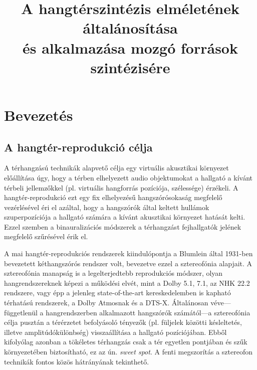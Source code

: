\documentclass[10pt,twoside]{article}
\author{\theauthor}
\title{A hangtérszintézis elméletének általánosítása\\[.5ex]és alkalmazása mozgó források szintézisére}
\theoremstyle{thesisgroupstyle}
\theoremstyle{indented}
\begin{document}
\sloppy
\newcommand{\schoolname}{Budapesti Műszaki és Gazdaságtudományi Egyetem}
\newcommand{\facultyname}{Villamosmérnöki és Informatikai Kar}
\newcommand{\doctoralname}{Villamosmérnöki Tudományok Doktori Iskola}
\newcommand{\bookname}{PhD tézisfüzet}
\newcommand{\authorname}{Author}
\newcommand{\supervisorname}{Konzulens:}
\newcommand{\supervisor}{Dr. Fiala Péter}
\newcommand{\creationdate}{Budapest, 2018.}
\def \deptlogo {logos/hit_logo_en.png}
\def \lablogo {logos/last_logo_eng.png}

\nonfrenchspacing


\thispagestyle{empty}
\cleardoublepage
\setcounter{page}{1}

\section{Bevezetés}

\subsection{A hangtér-reprodukció célja}
%
A térhangzású technikák alapvető célja egy virtuális akusztikai környezet előállítása úgy, hogy a térben elhelyezett audio objektumokat a hallgató a kívánt térbeli jellemzőkkel (pl. virtuális hangforrás pozíciója, szélessége) érzékeli.
A hangtér-reprodukció ezt egy fix elhelyezésű hangszórósokaság megfelelő vezérlésével éri el azáltal, hogy a hangszórók által keltett hullámok szuperpozíciója a hallgató számára a kívánt akusztikai környezet hatását kelti.
Ezzel szemben a binauralizációs módszerek a térhangzást fejhallgatók jelének megfelelő szűrésével érik el.

A mai hangtér-reprodukciós rendszerek kiindulópontja a Blumlein által 1931-ben bevezetett kéthangszórós rendszer volt, bevezetve ezzel a sztereofónia alapjait.
A sztereofónia manapság is a legelterjedtebb reprodukciós módszer, olyan hangrendszereknek képezi a működési elvét, mint a Dolby 5.1, 7.1, az NHK 22.2 rendszere, vagy épp a jelenleg state-of-the-art kereskedelemben is kapható térhatású rendszerek, a Dolby Atmosnak és a DTS-X.
Általánosan véve---függetlenül a hangrendszerben alkalmazott hangszórók számától---a sztereofónia célja pusztán a térérzetet befolyásoló tényezők (pl. füljelek közötti késleltetés, illetve amplitúdókülönbség) visszaállítása a hallgató pozíciójában.
Ebből kifolyólag azonban a tökéletes térhangzás csak a tér egyetlen pontjában és szűk környezetében biztosítható, ez az ún. \emph{sweet spot}.
A fenti megszorítás a sztereofon technikák fontos közös hátrányának tekinthető.
\end{document}
